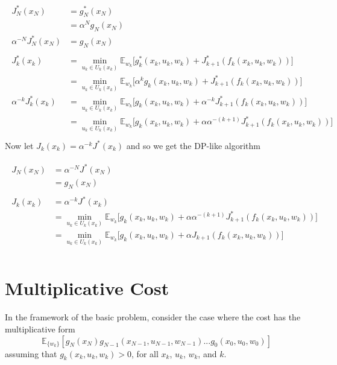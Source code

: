 \documentclass[11pt, oneside]{article}   	%
\begin{document}
\begin{align}
\begin{split}
J^{*}_N(x_N) &= g^{*}_N (x_N)\\
&= \alpha^N g_N(x_N)\\
\alpha^{-N} J^{*}_N(x_N) &= g_N(x_N)\\
\\
J^{*}_k(x_k) &= \min_{u_k \in U_k(x_k)} \mathbb{E}_{w_k} \big[g^{*}_k(x_k, u_k, w_k) + J^{*}_{k+1}(f_k(x_k, u_k, w_k))\big]\\
&= \min_{u_k \in U_k(x_k)} \mathbb{E}_{w_k} \big[\alpha^k g_k(x_k, u_k, w_k) + J^{*}_{k+1}(f_k(x_k, u_k, w_k))\big]\\
\alpha^{-k} J^{*}_k(x_k) &= \min_{u_k \in U_k(x_k)} \mathbb{E}_{w_k} \big[g_k(x_k, u_k, w_k) + \alpha^{-k} J^{*}_{k+1}(f_k(x_k, u_k, w_k))\big]\\
&= \min_{u_k \in U_k(x_k)} \mathbb{E}_{w_k} \big[g_k(x_k, u_k, w_k) + \alpha \alpha^{-(k+1)} J^{*}_{k+1}(f_k(x_k, u_k, w_k))\big]\\
\end{split}
\end{align}
Now let $J_k(x_k) = \alpha^{-k} J^{*} (x_k)$ and so we get the DP-like algorithm

\begin{align}
\begin{split}
J_N(x_N) &= \alpha^{-N} J^{*}(x_N)\\
&= g_N(x_N)\\
\\
J_k(x_k)&= \alpha^{-k} J^{*}(x_k)\\
&= \min_{u_k \in U_k(x_k)} \mathbb{E}_{w_k} \big[g_k(x_k, u_k, w_k) + \alpha \alpha^{-(k+1)} J^{*}_{k+1}(f_k(x_k, u_k, w_k))\big]\\
&= \min_{u_k \in U_k(x_k)} \mathbb{E}_{w_k} \big[g_k(x_k, u_k, w_k) + \alpha J_{k+1}(f_k(x_k, u_k, w_k))\big]\\
\end{split}
\end{align}

\section{Multiplicative Cost}
In the framework of the basic problem, consider the case where the cost has the multiplicative form $$\mathbb{E}_{\{w_k\}}[g_N(x_N) g_{N-1}(x_{N-1}, u_{N-1}, w_{N-1})... g_{0}(x_{0}, u_{0}, w_{0})]$$ assuming that $g_{k}(x_{k}, u_{k}, w_{k}) > 0
$, for all $x_k$, $u_k$, $w_k$, and $k$. \\
\end{document}
